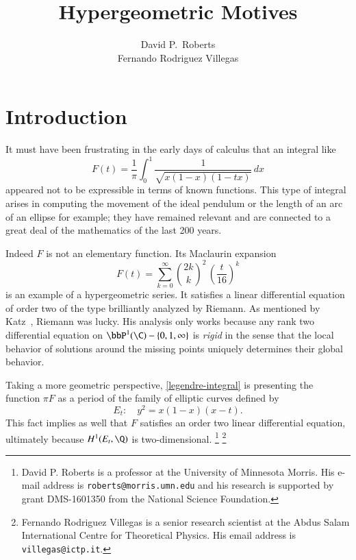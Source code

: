 \documentclass{notices}
\date{}
\title{Hypergeometric Motives}
\author{ David P.\ Roberts \\ Fernando Rodriguez Villegas}
\numberwithin{equation}{section}
\numberwithin{table}{section}
\numberwithin{figure}{section}
\begin{document}
\maketitle

\section{Introduction}
\label{intro}




It must have been frustrating in the early days of calculus that an integral like 
\begin{equation}
\label{legendre-integral}
F(t)=\frac{1}{\pi} \int_0^1\frac1{\sqrt{x(1-x)(1-tx)}}\,dx
\end{equation}
 appeared not to be
expressible in terms of known functions. 
This type of integral arises in computing the movement of the ideal pendulum 
or the length of an arc of an ellipse for example; they have remained
relevant and are connected to a great deal of the mathematics of the
last 200 years.

Indeed $F$ is not an elementary function. Its Maclaurin expansion 
\begin{equation}
\label{legendre-series}
F(t)=\sum_{k =0}^\infty \binom {2k}k^2\, \left(\frac t{16}\right)^k
\end{equation}
is an example of a hypergeometric series.  It satisfies a
linear differential equation of order two of the type brilliantly
analyzed by Riemann. As mentioned by Katz~\cite[p.3]{Katz-RLS}, Riemann
was lucky.  His analysis only works because any rank two differential equation on
$\bbP^1(\C) - \{0,1,\infty\}$
is {\it rigid} in the sense that the local behavior of solutions around
the missing points uniquely determines their global behavior. 

Taking a more geometric perspective, \eqref{legendre-integral}
is presenting the function $\pi F$ as a period of the 
family of elliptic curves defined by
\begin{equation}
\label{legendre-equation}
E_t: \quad y^2= x(1-x)(x-t).
\end{equation}
This fact implies as well
 that $F$
satisfies an order two linear differential equation, ultimately
because $H^1(E_t,\Q)$ is two-dimensional.  \let\thefootnote\relax\footnote{David P. Roberts is a professor at the University of Minnesota Morris.  His e-mail address is {\tt roberts@morris.umn.edu} and his research is supported by  grant DMS-1601350 from the National Science Foundation.}
\footnote{Fernando Rodriguez Villegas is a senior research scientist at the Abdus Salam International Centre for Theoretical Physics.  His email address is {\tt villegas@ictp.it}.}
\end{document}

